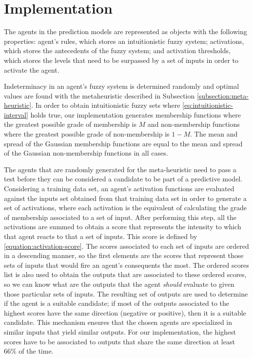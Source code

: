 \documentclass{ieeeaccess}
\begin{document}
\section{Implementation}
\label{section:implementation}

The agents in the prediction models are represented as objects with
the following properties: agent's rules, which stores an
intuitionistic fuzzy system; activations, which stores the antecedents
of the fuzzy system; and activation thresholds, which stores the
levels that need to be surpassed by a set of inputs in order to
activate the agent.

Indeterminacy in an agent's fuzzy system is determined randomly and
optimal values are found with the metaheuristic described in
Subsection \ref{subsection:meta-heuristic}. In order to obtain
intuitionistic fuzzy sets where \ref{eq:intuitionistic-interval} holds
true, our implementation generates membership functions where the
greatest possible grade of membership is $M$ and non-membership
functions where the greatest possible grade of non-membership is $1 -
M$. The mean and spread of the Gaussian membership functions are
equal to the mean and spread of the Gaussian non-membership functions
in all cases.

The agents that are randomly generated for the meta-heuristic need to
pass a test before they can be considered a candidate to be part of a
predictive model. Considering a training data set, an agent's
activation functions are evaluated against the inputs set obtained
from that training data set in order to generate a set of activations,
where each activation is the equivalent of calculating the grade of
membership associated to a set of input. After performing this step,
all the activations are summed to obtain a score that represents the
intensity to which that agent reacts to that a set of inputs. This
score is defined by \ref{equation:activation-score}. The scores
associated to each set of inputs are ordered in a descending manner,
so the first elements are the scores that represent those sets of
inputs that would fire an agent's consequents the most. The ordered
scores list is also used to obtain the outputs that are associated to
these ordered scores, so we can know what are the outputs that the
agent \textit{should} evaluate to given those particular sets of
inputs. The resulting set of outputs are used to determine if the
agent is a suitable candidate; if most of the outputs associated to
the highest scores have the same direction (negative or positive),
then it is a suitable candidate. This mechanism ensures that the
chosen agents are specialized in similar inputs that yield similar
outputs. For our implementation, the highest scores have to be
associated to outputs that share the same direction at least 66\% of
the time.
\end{document}
